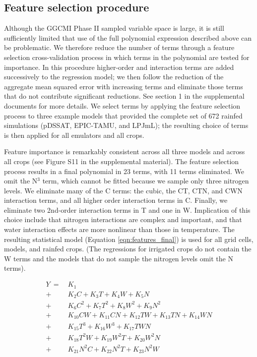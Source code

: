 \documentclass[esd, manuscript]{copernicus} %
\begin{document}
\subsection{Feature selection procedure}
Although the GGCMI Phase II sampled variable space is large, it is still sufficiently limited that use of the full polynomial expression described above can be problematic. We therefore reduce the number of terms through a feature selection cross-validation process in which terms in the polynomial are tested for importance. In this procedure higher-order and interaction terms are added successively to the regression model; we then follow the reduction of the aggregate mean squared error with increasing terms and eliminate those terms that do not contribute significant reductions. See section 1 in the supplemental documents for more details. We select terms by applying the feature selection process to three example models that provided the complete set of 672 rainfed simulations (pDSSAT, EPIC-TAMU, and LPJmL); the resulting choice of terms is then applied for all emulators and all crops.


Feature importance is remarkably consistent across all three models and across all crops (see Figure S11 in the supplemental material). The feature selection process results in a final polynomial in 23 terms, with 11 terms eliminated. We omit the N$^3$ term, which cannot be fitted because we sample only three nitrogen levels. We eliminate many of the C terms: the cubic, the CT, CTN, and CWN interaction terms, and all higher order interaction terms in C. Finally, we eliminate two 2nd-order interaction terms in T and one in W. Implication of this choice include that nitrogen interactions are complex and important, and that water interaction effects are more nonlinear than those in temperature. The resulting statistical model (Equation \ref{eqn:features_final}) is used for all grid cells, models, and rainfed crops. (The regressions for irrigated crops do not contain the W terms and the models that do not sample the nitrogen levels omit the N terms).

\begin{align}
    \label{eqn:features_final}
    Y\ = \ & K_{1}  \\
		+ \ & K_{2}  C     + K_{3}  T     + K_{4}  W     + K_{5}  N   \nonumber \\
		+ \ & K_{6}  C^2   + K_{7}  T^2   + K_{8}  W^2   + K_{9}  N^2 \nonumber \\
		+ \ & K_{10} C W   + K_{11} C N   + K_{12} T W   + K_{13} T N + K_{14} W N \nonumber \\ %
		+ \ & K_{15} T^3   + K_{16} W^3   + K_{17} T W N  \nonumber \\ %
		+ \ & K_{18} T^2 W + K_{19} W^2 T + K_{20} W^2 N  \nonumber \\ %
		+ \ & K_{21} N^2 C + K_{22} N^2 T + K_{23} N^2 W  \nonumber    %
\end{align}
\end{document}
